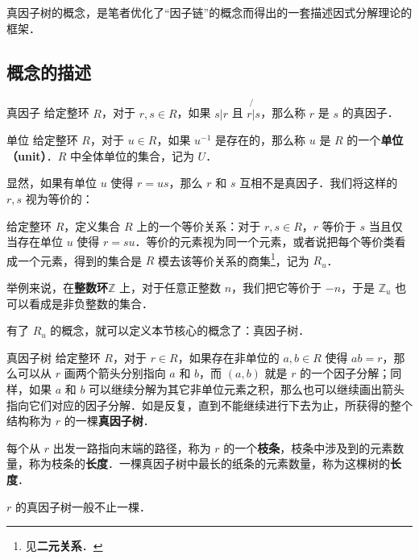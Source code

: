 

真因子树的概念，是笔者优化了“因子链”的概念而得出的一套描述因式分解理论的框架．

\subsection{概念的描述}

\begin{definition}{真因子}
给定整环 $R$，对于 $r, s\in R$，如果 $s|r$ 且 $r\not{|}s$，那么称 $r$ 是 $s$ 的真因子．
\end{definition}

\begin{definition}{单位}
给定整环 $R$，对于 $u\in R$，如果 $u^{-1}$ 是存在的，那么称 $u$ 是 $R$ 的一个\textbf{单位（unit）}．$R$ 中全体单位的集合，记为 $U$．
\end{definition}

显然，如果有单位 $u$ 使得 $r=us$，那么 $r$ 和 $s$ 互相不是真因子．我们将这样的 $r, s$ 视为等价的：

\begin{definition}{}
给定整环 $R$，定义集合 $R$ 上的一个等价关系：对于 $r, s\in R$，$r$ 等价于 $s$ 当且仅当存在单位 $u$ 使得 $r=su$．等价的元素视为同一个元素，或者说把每个等价类看成一个元素，得到的集合是 $R$ 模去该等价关系的商集\footnote{见\textbf{二元关系}．}，记为 $R_u$．
\end{definition}

举例来说，在\textbf{整数环}$\mathbb{Z}$ 上，对于任意正整数 $n$，我们把它等价于 $-n$，于是 $\mathbb{Z}_u$ 也可以看成是非负整数的集合．

有了 $R_u$ 的概念，就可以定义本节核心的概念了：真因子树．

\begin{definition}{真因子树}
给定整环 $R$，对于 $r\in R$，如果存在非单位的 $a, b\in R$ 使得 $ab=r$，那么可以从 $r$ 画两个箭头分别指向 $a$ 和 $b$，而 $(a, b)$ 就是 $r$ 的一个因子分解；同样，如果 $a$ 和 $b$ 可以继续分解为其它非单位元素之积，那么也可以继续画出箭头指向它们对应的因子分解．如是反复，直到不能继续进行下去为止，所获得的整个结构称为 $r$ 的一棵\textbf{真因子树}．

每个从 $r$ 出发一路指向末端的路径，称为 $r$ 的一个\textbf{枝条}，枝条中涉及到的元素数量，称为枝条的\textbf{长度}．一棵真因子树中最长的纸条的元素数量，称为这棵树的\textbf{长度}．

$r$ 的真因子树一般不止一棵．
\end{definition}

